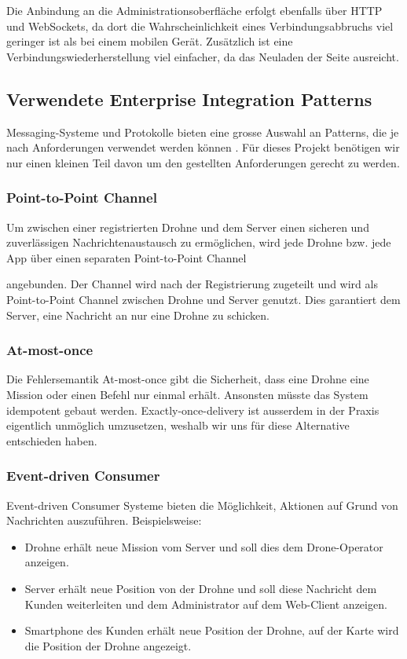 {Die Anbindung an die Administrationsoberfläche erfolgt ebenfalls über HTTP und WebSockets, da dort die Wahrscheinlichkeit eines Verbindungsabbruchs viel geringer ist als bei einem mobilen Gerät. Zusätzlich ist eine Verbindungswiederherstellung viel einfacher, da das Neuladen der Seite ausreicht. \\


\subsection{Verwendete Enterprise Integration Patterns}
Messaging-Systeme und Protokolle bieten eine grosse Auswahl an Patterns, die je nach Anforderungen verwendet werden können \cite{EIP}. Für dieses Projekt benötigen wir nur einen kleinen Teil davon um den gestellten Anforderungen gerecht zu werden.
%
\subsubsection{Point-to-Point Channel}
Um zwischen einer registrierten Drohne und dem Server einen sicheren und zuverlässigen Nachrichtenaustausch zu ermöglichen, wird jede Drohne bzw. jede App über einen separaten Point-to-Point Channel	\cite[S. 103]{EIP}} angebunden. Der Channel wird nach der Registrierung zugeteilt und wird als Point-to-Point Channel zwischen Drohne und Server genutzt. Dies garantiert dem Server, eine Nachricht an nur eine Drohne zu schicken.
%
\subsubsection{At-most-once}

Die Fehlersemantik At-most-once gibt die Sicherheit, dass eine Drohne eine Mission oder einen Befehl nur einmal erhält. Ansonsten müsste das System idempotent gebaut werden. Exactly-once-delivery ist ausserdem in der Praxis eigentlich unmöglich umzusetzen, weshalb wir uns für diese Alternative entschieden haben. 
%
\subsubsection{Event-driven Consumer}
{Event-driven Consumer \cite[S. 442]{EIP}} Systeme bieten die Möglichkeit, Aktionen auf Grund von Nachrichten auszuführen. Beispielsweise:

\begin{itemize}
	\item Drohne erhält neue Mission vom Server und soll dies dem Drone-Operator anzeigen.
	\item Server erhält neue Position von der Drohne und soll diese Nachricht dem Kunden weiterleiten und dem Administrator auf dem Web-Client anzeigen.
	\item Smartphone des Kunden erhält neue Position der Drohne, auf der Karte wird die Position der Drohne angezeigt.
\end{itemize}

